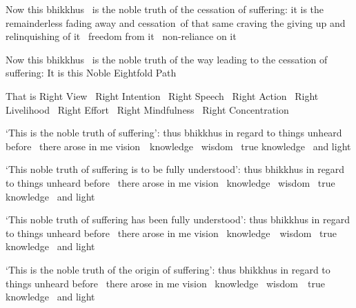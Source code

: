 \ifninebythirteen\clearpage\fi

\begin{english-only-hang}
  Now this bhikkhus \breathmark\ is the noble truth of the cessation of suffering: it is the remainderless fading away and cessation\breathmark\ of that same craving the giving up and relinquishing of it \breathmark\ freedom from it \breathmark\ non-reliance on it
\end{english-only-hang}

\begin{english-only-hang}
  Now this bhikkhus \breathmark\ is the noble truth of the way leading to the cessation of suffering: It is this Noble Eightfold Path
\end{english-only-hang}

\begin{english-only-hang}
  That is Right View \breathmark\ Right Intention \breathmark\ Right Speech \breathmark\ Right Action \breathmark\ Right Livelihood \breathmark\ Right Effort \breathmark\ Right Mindfulness \breathmark\ Right Concentration
\end{english-only-hang}

\begin{english-only-hang}
  `This is the noble truth of suffering': thus bhikkhus in regard to things unheard before \breathmark\ there arose in me \mbox{vision}~\breathmark\ knowledge \breathmark\ wisdom \breathmark\ true knowledge \breathmark\ and light
\end{english-only-hang}

\begin{english-only-hang}
  `This noble truth of suffering is to be fully understood': thus bhikkhus in regard to things unheard before \breathmark\ there arose in me vision \breathmark\ knowledge \breathmark\ wisdom \breathmark\ true knowledge \breathmark\ and light
\end{english-only-hang}

\begin{english-only-hang}
  `This noble truth of suffering has been fully understood': thus bhikkhus in regard to things unheard before \breathmark\ there arose in me vision \breathmark\ \mbox{knowledge}~\breathmark\ wisdom \breathmark\ true knowledge \breathmark\ and light
\end{english-only-hang}

\ifbfive\clearpage\fi

\begin{english-only-hang}
  `This is the noble truth of the origin of suffering': thus bhikkhus in regard to things unheard before \breathmark\ there arose in me vision \breathmark\ knowledge \breathmark\ \mbox{wisdom}~\breathmark\ true knowledge \breathmark\ and light
\end{english-only-hang}

